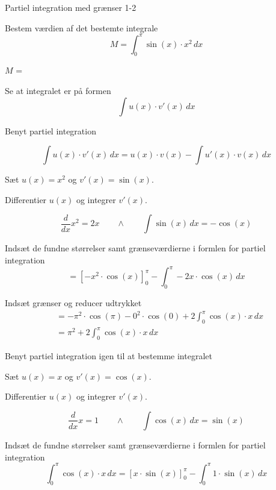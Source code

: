 \documentclass{article}
\begin{document}
\begin{exercise}{Partiel integration med grænser 1-2}
	
	
	Bestem værdien af det bestemte integrale
	\[
	M = \int_0^\pi \sin(x) \cdot x^2 \, dx
	\]
	
	$M$ =  \\
	
	
	\hint
	
	Se at integralet er på formen
	\[
	\int u(x) \cdot v'(x) \, dx
	\]
	
	\hint
	
	Benyt partiel integration
	
	\hint
	\[
	\int u(x) \cdot v'(x)\, dx = u(x) \cdot v(x) - \int u'(x) \cdot v(x) \, dx
	\]
	
	\hint
	
	Sæt $u(x) = x^2$ og $v'(x) = \sin(x)$.
	
	
	\hint
	
	Differentier $u(x)$ og integrer $v'(x)$.
	
	\hint
	\[
	\frac{d}{dx}x^2 = 2x \qquad \wedge \qquad \int \sin(x) \, dx = -\cos(x)
	\]
	
	\hint
	
	Indsæt de fundne størrelser samt grænseværdierne i formlen for partiel integration 
	\[
	= \left[-x^2 \cdot \cos(x) \right]_{0}^{\pi} - \int_{0}^{\pi} -2x \cdot \cos(x)  \, dx
	\]
	
	\hint
	
	Indsæt grænser og reducer udtrykket
	\begin{align*}
	&= -\pi^2 \cdot \cos(\pi) - 0^2 \cdot \cos(0)   + 2 \int_{0}^{\pi} \cos(x) \cdot x  \, dx \\
	&= \pi^2 + 2  \int_{0}^{\pi} \cos(x) \cdot x  \, dx
	\end{align*}
	
	\hint 
	Benyt partiel integration igen til at bestemme integralet

	
	\hint
	
	Sæt $u(x) = x$ og $v'(x) = \cos(x)$.
	
	
	\hint
	
	Differentier $u(x)$ og integrer $v'(x)$.
	
	\hint
	\[
	\frac{d}{dx}x = 1 \qquad \wedge \qquad \int \cos(x) \, dx = \sin(x)
	\]
	
	\hint
	
	Indsæt de fundne størrelser samt grænseværdierne i formlen for partiel integration 
	\[
	\int_{0}^{\pi} \cos(x) \cdot x  \, dx = \left[ x \cdot \sin(x) \right]_0^\pi - \int_0^\pi 1 \cdot \sin(x) \, dx
	\]
	

\end{exercise}
\end{document}
